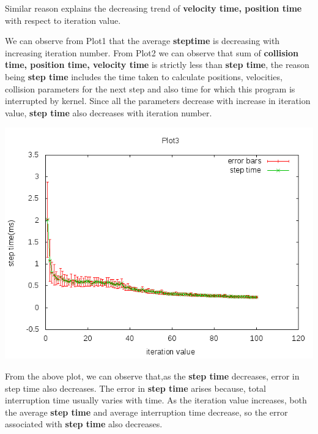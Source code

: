 \documentclass[11pt]{article}
\begin{document}
Similar reason explains the decreasing trend of {\bf velocity time, position time} with respect to iteration value.


We can observe from Plot1 that the average {\bf steptime} is decreasing with increasing iteration number. From Plot2 we can observe that sum of {\bf collision time, position time, velocity time} is strictly less than {\bf step time}, the reason being {\bf step time} includes the time taken to calculate positions, velocities, collision parameters for the next step and also time for which this program is interrupted by kernel. Since all the parameters decrease with increase in iteration value, {\bf step time} also decreases with iteration number.

\centerline{\includegraphics[scale=0.7]{g28_plot03}}

From the above plot, we can observe that,as the {\bf step time} decreases, error in step time also decreases. The error in {\bf step time} arises because, total interruption time usually varies with time. As the iteration value increases, both the average {\bf step time} and average interruption time decrease, so the error associated with {\bf step time}
also decreases.
\end{document}
